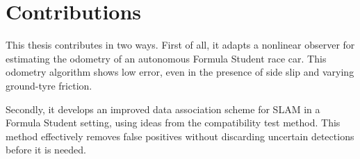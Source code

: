 \section{Contributions}
This thesis contributes in two ways. First of all, it adapts a nonlinear observer for estimating the odometry of an autonomous Formula Student race car. This odometry algorithm shows low error, even in the presence of side slip and varying ground-tyre friction. 

Secondly, it develops an improved data association scheme for \gls{SLAM} in a Formula Student setting, using ideas from the compatibility test method. This method effectively removes false positives without discarding uncertain detections before it is needed.